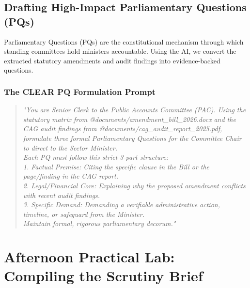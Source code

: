 \documentclass[11pt, a4paper]{report}
\begin{document}
\section{Drafting High-Impact Parliamentary Questions (PQs)}
Parliamentary Questions (PQs) are the constitutional mechanism through which standing committees hold ministers accountable. Using the AI, we convert the extracted statutory amendments and audit findings into evidence-backed questions.

\subsection{The CLEAR PQ Formulation Prompt}
\begin{quote}
\small
\textit{"You are Senior Clerk to the Public Accounts Committee (PAC). Using the statutory matrix from @documents/amendment\_bill\_2026.docx and the CAG audit findings from @documents/cag\_audit\_report\_2025.pdf, formulate three formal Parliamentary Questions for the Committee Chair to direct to the Sector Minister. \\
Each PQ must follow this strict 3-part structure: \\
1. Factual Premise: Citing the specific clause in the Bill or the page/finding in the CAG report. \\
2. Legal/Financial Core: Explaining why the proposed amendment conflicts with recent audit findings. \\
3. Specific Demand: Demanding a verifiable administrative action, timeline, or safeguard from the Minister. \\
Maintain formal, rigorous parliamentary decorum."}
\end{quote}

\vspace{1.5em}
\noindent{}
\vspace{1.5em}

\newpage

\chapter{Afternoon Practical Lab: Compiling the Scrutiny Brief}
\end{document}
